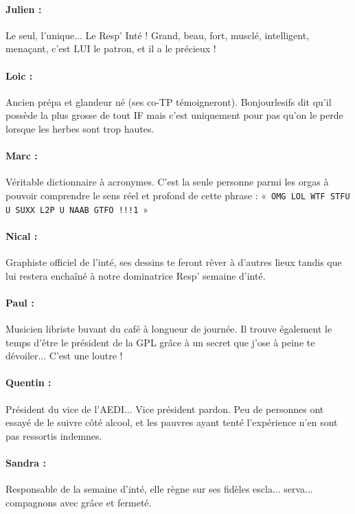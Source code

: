 \paragraph{Julien :}  Le seul, l'unique... Le Resp' Inté ! Grand, beau, fort, musclé, intelligent, menaçant, c'est LUI le patron, et il a le précieux !
\paragraph{Loic :} Ancien prépa et glandeur né (ses co-TP témoigneront). Bonjourlesifs dit qu'il possède la plus grosse de tout IF mais c'est uniquement pour pas qu'on le perde lorsque les herbes sont trop hautes.
\paragraph{Marc :} Véritable dictionnaire à acronymes. C'est la seule personne parmi les orgas à pouvoir comprendre le sens réel et profond de cette phrase : «~\texttt{OMG LOL WTF STFU U SUXX L2P U NAAB GTFO !!!1}~»
\paragraph{Nical :} Graphiste officiel de l'inté, ses dessins te feront rêver à d'autres lieux tandis que lui restera enchaîné à notre dominatrice Resp' semaine d'inté.
\paragraph{Paul :} Musicien libriste buvant du café à longueur de journée. Il trouve également le temps d'être le président de la GPL grâce à un secret que j'ose à peine te dévoiler... C'est une loutre !
\paragraph{Quentin :} Président du vice de l'AEDI... Vice président pardon. Peu de personnes ont essayé de le suivre côté alcool, et les pauvres ayant tenté l'expérience n'en sont pas ressortis indemnes.
\paragraph{Sandra :} Responsable de la semaine d'inté, elle règne sur ses fidèles escla... serva... compagnons avec grâce et fermeté.
\vspace{0.5cm}
